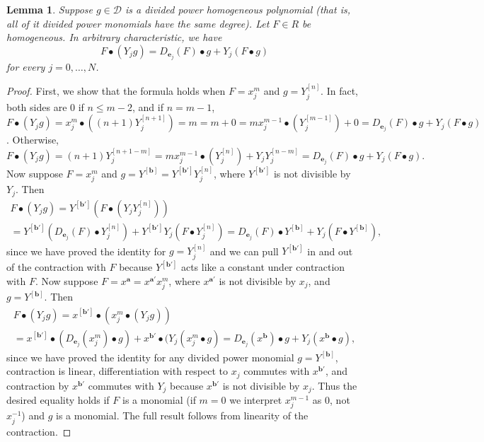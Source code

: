 \documentclass[12pt, reqno]{amsart}
\numberwithin{equation}{section}
\newcommand{\ba}{\mathbf{a}}
\newcommand{\bb}{\mathbf{b}}
\newcommand{\be}{\mathbf{e}}
\newcommand{\contract}{\bullet}
\theoremstyle{plain} %
\newtheorem{lem}[thm]{Lemma}
\theoremstyle{definition}
\theoremstyle{remark}
\begin{document}
\begin{lem}\label{lem:prodruledivided}
Suppose $g\in \mathcal{D}$ is a divided power homogeneous polynomial (that is, all of it divided power monomials have the same degree).  Let $F\in R$ be homogeneous.  In arbitrary characteristic, we have
\[
F\contract (Y_jg) = D_{\be_j}(F)\contract g + Y_j\left(F\contract g\right)
\]
for every $j=0,\ldots,N$.
\end{lem}
\begin{proof}
First, we show that the formula holds when $F=x_j^{m}$ and $g=Y_j^{[n]}$. In fact, both sides are $0$ if $n\le m-2$, and if $n=m-1$, $F\contract (Y_jg) =  x_j^{m} \contract ((n+1)Y_j^{[n+1]}) = m=m+0= mx_j^{m-1} \contract (Y_j^{[m-1]})+0 = D_{\be_j}(F)\contract g+Y_j(F\contract g)$. Otherwise, 
\[
F\contract (Y_jg)=(n+1)Y_j^{[n+1-m]}=mx_j^{m-1} \contract (Y_j^{[n]}) + Y_jY_j^{[n-m]}=D_{\be_j}(F)\contract g+Y_j(F\contract g).
\]
Now suppose $F=x_j^m$ and $g=Y^{[\bb]}=Y^{[\bb']}Y_j^{[n]}$, where $Y^{[\bb']}$ is not divisible by $Y_j$.  Then
\begin{multline*}
F\contract (Y_jg)=Y^{[\bb']}(F\contract (Y_jY_j^{[n]}))
\\=Y^{[\bb']}(D_{\be_j}(F)\contract Y_j^{[n]}) + Y^{[\bb']}Y_j(F\contract Y_j^{[n]})=D_{\be_j}(F)\contract Y^{[\bb]}+Y_j(F\contract Y^{[\bb]}),
\end{multline*}
since we have proved the identity for $g=Y_j^{[n]}$ and we can pull $Y^{[\bb']}$ in and out of the contraction with $F$ because $Y^{[\bb']}$ acts like a constant under contraction with $F$.  Now suppose $F=x^{\ba}=x^{\ba'}x_j^{m}$, where $x^{\ba'}$ is not divisible by $x_j$, and $g=Y^{[\bb]}$.  Then
\begin{multline*}
	F\contract (Y_jg)=x^{[\bb']}\contract(x_j^{m}\contract (Y_jg))
	\\=x^{[\bb']}\contract (D_{\be_j}(x_j^{m})\contract g) + x^{\bb'}\contract (Y_j(x_j^{m}\contract g)=D_{\be_j}(x^{\bb})\contract g+Y_j(x^{\bb}\contract g),
\end{multline*}
since we have proved the identity for any divided power monomial $g=Y^{[\bb]}$, contraction is linear, differentiation with respect to $x_j$ commutes with $x^{\bb'}$, and contraction by $x^{\bb'}$ commutes with $Y_j$ because $x^{\bb'}$ is not divisible by $x_j$.  Thus the desired equality holds if $F$ is a monomial (if $m=0$ we interpret $x_j^{m-1}$ as $0$, not $x_j^{-1}$) and $g$ is a monomial. The full result follows from linearity of the contraction.
\end{proof}
\end{document}
